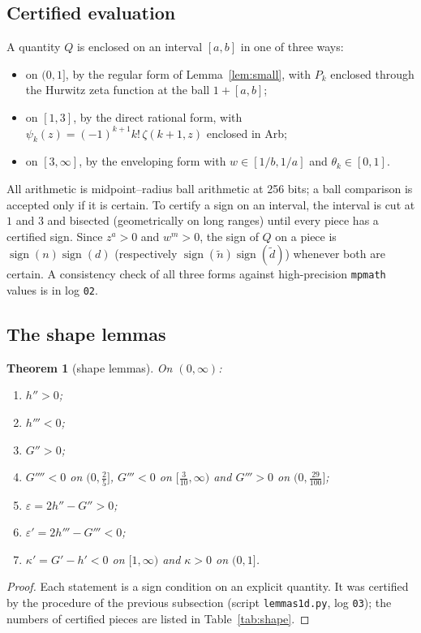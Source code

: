 \documentclass[11pt,a4paper]{article}
\newtheorem{theorem}{Theorem}[section]
\theoremstyle{definition}
\theoremstyle{remark}
\newcommand{\eps}{\varepsilon}
\begin{document}
\subsection{Certified evaluation}
A quantity $Q$ is enclosed on an interval $[a,b]$ in one of three ways:
\begin{itemize}
\item on $(0,1]$, by the regular form of Lemma~\ref{lem:small}, with $P_k$ enclosed through the Hurwitz zeta function at the ball $1+[a,b]$;
\item on $[1,3]$, by the direct rational form, with $\psi_k(z)=(-1)^{k+1}k!\,\zeta(k+1,z)$ enclosed in Arb;
\item on $[3,\infty]$, by the enveloping form with $w\in[1/b,1/a]$ and $\theta_k\in[0,1]$.
\end{itemize}
All arithmetic is midpoint--radius ball arithmetic at 256 bits; a ball comparison is accepted only if it is certain. To certify a sign on an interval, the interval is cut at $1$ and $3$ and bisected (geometrically on long ranges) until every piece has a certified sign. Since $z^a>0$ and $w^m>0$, the sign of $Q$ on a piece is $\operatorname{sign}(n)\operatorname{sign}(d)$ (respectively $\operatorname{sign}(\tilde n)\operatorname{sign}(\tilde d)$) whenever both are certain. A consistency check of all three forms against high-precision \texttt{mpmath} values is in log \texttt{02}.

\subsection{The shape lemmas}
\begin{theorem}[shape lemmas]\label{thm:shape}
On $(0,\infty)$:
\begin{enumerate}[label=\textup{(S\arabic*)},leftmargin=3.2em]
\item $h''>0$;
\item $h'''<0$;
\item $G''>0$;
\item $G''''<0$ on $(0,\frac25]$, $G'''<0$ on $[\frac3{10},\infty)$ and $G'''>0$ on $(0,\frac{29}{100}]$;
\item $\eps=2h''-G''>0$;
\item $\eps'=2h'''-G'''<0$;
\item $\kappa'=G'-h'<0$ on $[1,\infty)$ and $\kappa>0$ on $(0,1]$.
\end{enumerate}
\end{theorem}
\begin{proof}
Each statement is a sign condition on an explicit quantity. It was certified by the procedure of the previous subsection (script \texttt{lemmas1d.py}, log \texttt{03}); the numbers of certified pieces are listed in Table~\ref{tab:shape}.
\end{proof}
\end{document}
